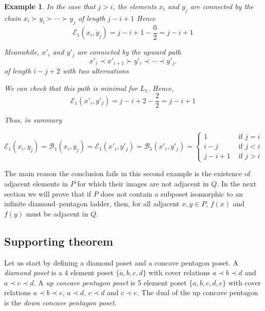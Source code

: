 \documentclass{article}[12pt]
\theoremstyle{exampstyle}
\newtheorem{example}[theorem]{Example}
\theoremstyle{remark}
\newcommand{\B}{\mathcal{B}}
\newcommand{\E}{\mathcal{E}}
\begin{document}
\begin{example}
    In the case that $j > i$, the elements $x_{i}$ and $y_j$ are connected by the chain $x_i \succ y_i \succ \cdots \succ y_j$ of length $j - i + 1$ Hence
     \[
        \E_1(x_i, y_j) = j-i+1 - \frac{0}{2} = j-i + 1
    \]

    Meanwhile, $x'_{i}$ and $y'_j$ are connected  by the upward path 
    \[x'_{i} \prec x'_{i+1} \succ y'_{i} \prec  \cdots \prec y'_j.\]  
     of length $i-j+2$ with two alternations
    
    We can check that this path is minimal for $L_1$. Hence,
    \[
    \E_1(x'_i, y'_j) =  j-i+2 - \frac{2}{2} = j-i + 1 
    \]
 
    Thus, in summary 

    \begin{equation*}
        \E_1(x_i,y_j)   = \B_1(x_i,y_j) = \E_1(x'_i,y'_j)  = \B_1(x'_i,y'_j)  = 
        \begin{cases}
            1 & \text{ if } j = i  \\
           i-j  & \text{ if } j < i \\
           j-i + 1 & \text{ if } j > i 
        \end{cases}
    \end{equation*}
\end{example}

The main reason the conclusion fails in this second example is the existence of adjacent elements in $P$ for which their images are not adjacent in $Q$. In the next section we will prove that if $P$ does not contain a subposet isomorphic to an infinite diamond–pentagon ladder, then, for all adjacent $x,y \in P$, $f(x)$ and $f(y)$ must be adjacent in $Q$.

\subsection{Supporting theorem}

Let us start by defining a diamond poset and a concave pentagon poset. A \textit{diamond poset} is a 4 element poset $\{a,b,c,d\}$ with cover relations $a \prec b \prec d$ and $a \prec c \prec d$.
A \textit{up concave pentagon poset} is 5 element poset $\{a,b,c,d,e\}$ with cover relations $a \prec b \prec e $, $a \prec d$, $c \prec d$ and $c \prec e$. The dual of the up concave pentagon is the \textit{down concave pentagon poset}. 
\end{document}
